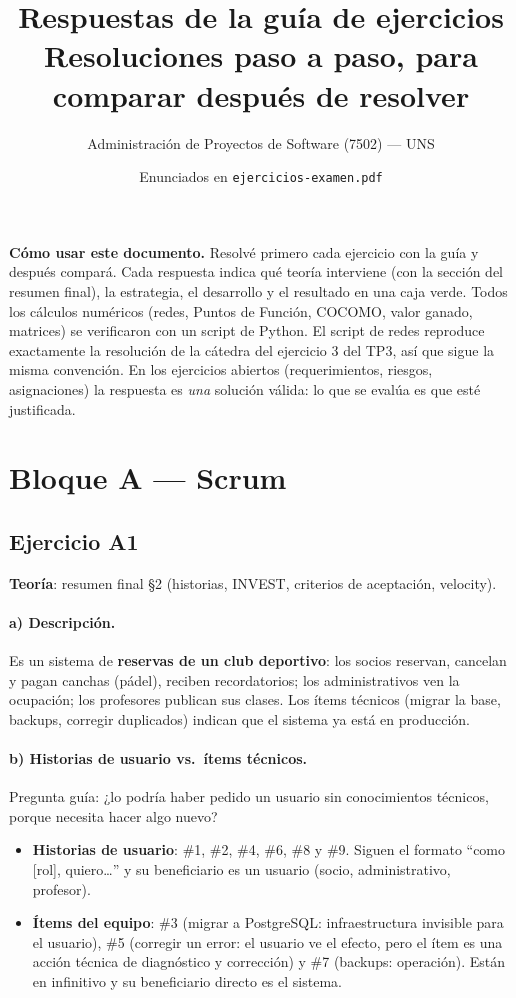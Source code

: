 \documentclass[11pt,a4paper]{article}
\title{\vspace{-1.6cm}\textbf{Respuestas de la guía de ejercicios}\\[4pt]
\large Resoluciones paso a paso, para comparar después de resolver}
\author{\normalsize Administración de Proyectos de Software (7502) --- UNS}
\date{\normalsize Enunciados en \texttt{ejercicios-examen.pdf}}
\begin{document}
\maketitle
\thispagestyle{empty}

\begin{yavisto}
\textbf{Cómo usar este documento.} Resolvé primero cada ejercicio con la guía y después compará. Cada respuesta
indica qué teoría interviene (con la sección del resumen final), la estrategia, el desarrollo y el resultado en
una caja verde. Todos los cálculos numéricos (redes, Puntos de Función, COCOMO, valor ganado, matrices) se
verificaron con un script de Python. El script de redes reproduce exactamente la resolución de la cátedra del
ejercicio 3 del TP3, así que sigue la misma convención. En los ejercicios abiertos (requerimientos, riesgos,
asignaciones) la respuesta es \emph{una} solución válida: lo que se evalúa es que esté justificada.
\end{yavisto}

\tableofcontents
\newpage

\section{Bloque A --- Scrum}
\subsection*{Ejercicio A1}
\textbf{Teoría}: resumen final §2 (historias, INVEST, criterios de aceptación, velocity).

\paragraph{a) Descripción.} Es un sistema de \textbf{reservas de un club deportivo}: los socios reservan, cancelan
y pagan canchas (pádel), reciben recordatorios; los administrativos ven la ocupación; los profesores publican sus
clases. Los ítems técnicos (migrar la base, backups, corregir duplicados) indican que el sistema ya está en
producción.

\paragraph{b) Historias de usuario vs.\ ítems técnicos.} Pregunta guía: ¿lo podría haber pedido un usuario sin
conocimientos técnicos, porque necesita hacer algo nuevo?
\begin{itemize}
  \item \textbf{Historias de usuario}: \#1, \#2, \#4, \#6, \#8 y \#9. Siguen el formato ``como [rol], quiero\ldots''
  y su beneficiario es un usuario (socio, administrativo, profesor).
  \item \textbf{Ítems del equipo}: \#3 (migrar a PostgreSQL: infraestructura invisible para el usuario), \#5
  (corregir un error: el usuario ve el efecto, pero el ítem es una acción técnica de diagnóstico y corrección) y
  \#7 (backups: operación). Están en infinitivo y su beneficiario directo es el sistema.
\end{itemize}
\end{document}
